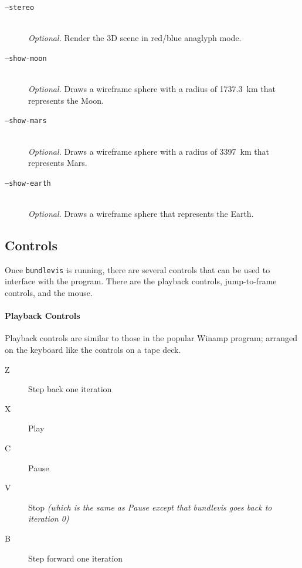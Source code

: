 \begin{description}
\item[\texttt{--stereo}] \hfill \\
  \emph{Optional.} Render the 3D scene in red/blue anaglyph mode.

\item[\texttt{--show-moon}] \hfill \\
  \emph{Optional.} Draws a wireframe sphere with a radius of 1737.3~km
  that represents the Moon.

\item[\texttt{--show-mars}] \hfill \\
  \emph{Optional.} Draws a wireframe sphere with a radius of 3397~km
  that represents Mars.

\item[\texttt{--show-earth}] \hfill \\
  \emph{Optional.} Draws a wireframe sphere that represents the Earth.

\end{description}

\subsection{Controls}

Once \texttt{bundlevis} is running, there are several controls that
can be used to interface with the program. There are the playback
controls, jump-to-frame controls, and the mouse.

\paragraph{Playback Controls}

Playback controls are similar to those in the popular Winamp program;
arranged on the keyboard like the controls on a tape deck.

\newenvironment{myindentpar}[1]
               {\begin{list}{}
                   {\setlength{\leftmargin}{#1}}
                 \item[]
               }
               {\end{list}}

\begin{myindentpar}{3cm}
\begin{description}
  \item[Z] Step back one iteration
  \item[X] Play
  \item[C] Pause
  \item[V] Stop \emph{(which is the same as Pause except that
    bundlevis goes back to iteration 0)}
  \item[B] Step forward one iteration
\end{description}
\end{myindentpar}

